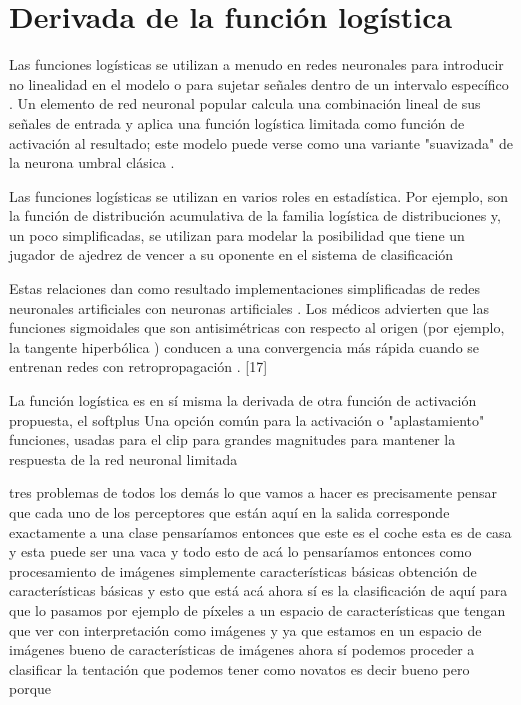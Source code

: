 \section{Derivada de la función logística}

Las funciones logísticas se utilizan a menudo en redes neuronales para introducir no linealidad en el modelo o para sujetar señales dentro de un intervalo específico . Un elemento de red neuronal popular calcula una combinación lineal de sus señales de entrada y aplica una función logística limitada como función de activación al resultado; este modelo puede verse como una variante "suavizada" de la neurona umbral clásica .

Las funciones logísticas se utilizan en varios roles en estadística. Por ejemplo, son la función de distribución acumulativa de la familia logística de distribuciones y, un poco simplificadas, se utilizan para modelar la posibilidad que tiene un jugador de ajedrez de vencer a su oponente en el sistema de clasificación 

Estas relaciones dan como resultado implementaciones simplificadas de redes neuronales artificiales con neuronas artificiales . Los médicos advierten que las funciones sigmoidales que son antisimétricas con respecto al origen (por ejemplo, la tangente hiperbólica ) conducen a una convergencia más rápida cuando se entrenan redes con retropropagación . [17]

La función logística es en sí misma la derivada de otra función de activación propuesta, el softplus 
Una opción común para la activación o "aplastamiento" funciones, usadas para el clip para grandes magnitudes para mantener la respuesta de la red neuronal limitada 

tres problemas de todos los demás lo que vamos a hacer es precisamente pensar que cada uno de los perceptores que están aquí en la salida corresponde exactamente a una clase pensaríamos entonces que este es el coche esta es de casa y esta puede ser una vaca y todo esto de acá lo pensaríamos entonces como procesamiento de imágenes simplemente características básicas obtención de características básicas y esto que está acá ahora sí es la clasificación de aquí para que lo pasamos por ejemplo de píxeles a un espacio de características que tengan que ver con interpretación como imágenes y ya que estamos en un espacio de imágenes bueno de características de imágenes ahora sí podemos proceder a clasificar la tentación que podemos tener como novatos es decir bueno pero porque 

